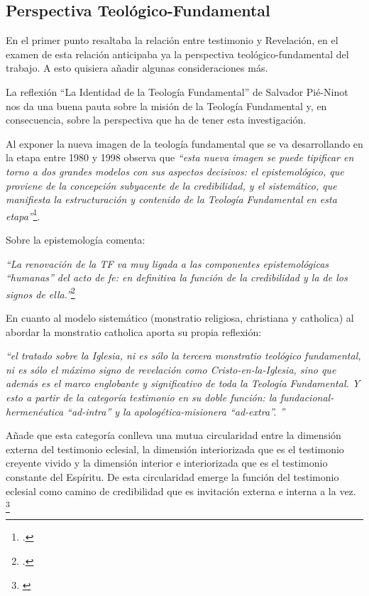 \documentclass[11pt]{article}
\begin{document}
\subsection{Perspectiva Teológico-Fundamental}

En el primer punto resaltaba la relación entre testimonio y Revelación, en el examen de esta relación anticipaba ya la perspectiva teológico-fundamental del trabajo. A esto quisiera añadir algunas consideraciones más.

La reflexión ``La Identidad de la Teología Fundamental'' de Salvador Pié-Ninot nos da una buena pauta sobre la misión de la Teología Fundamental y, en consecuencia, sobre la perspectiva que ha de tener esta investigación. 

Al exponer la nueva imagen de la teología fundamental que se va desarrollando en la etapa entre 1980 y 1998 observa que \emph{``esta nueva imagen se puede tipificar en torno a dos grandes modelos con sus aspectos decisivos: el epistemológico, que proviene de la concepción subyacente de la credibilidad, y el sistemático, que manifiesta la estructuración y contenido de la Teología Fundamental en esta etapa''}\footcite[29]{ninotTF}.

Sobre la epistemología comenta:

\emph{
``La renovación de la TF va muy ligada a las componentes epistemológicas ``humanas'' del acto de fe: en definitiva la función de la credibilidad y la de los signos de ella.''}\footcite[31]{ninotTF}

En cuanto al modelo sistemático (monstratio religiosa, christiana y catholica) al abordar la monstratio catholica aporta su propia reflexión:

\emph{
``el tratado sobre la Iglesia, ni es sólo la tercera monstratio teológico fundamental, ni es sólo el máximo signo de revelación como Cristo-en-la-Iglesia, sino que además es el marco englobante y significativo de toda la Teología Fundamental. Y esto a partir de la categoría testimonio en su doble función: la fundacional-hermenéutica ``ad-intra'' y la apologética-misionera ``ad-extra''. ''}

Añade que esta categoría conlleva una mutua circularidad entre la dimensión externa del testimonio eclesial, la dimensión interiorizada que es el testimonio creyente vivido y la dimensión interior e interiorizada que es el testimonio constante del Espíritu. De esta circularidad emerge la función del testimonio eclesial como camino de credibilidad que es invitación externa e interna a la vez. \footnote{\cite[40]{ninotTF}}
\end{document}

